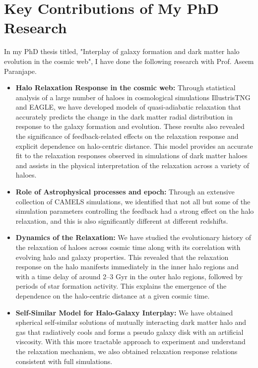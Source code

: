 \documentclass[10pt]{article}
\begin{document}
\section{Key Contributions of My PhD Research}

In my PhD thesis titled, "Interplay of galaxy formation and dark matter halo evolution in the cosmic web", I have done the following research with Prof. Aseem Paranjape.

\begin{itemize}
    \item \textbf{Halo Relaxation Response in the cosmic web:} Through statistical analysis of a large number of haloes in cosmological simulations IllustrisTNG and EAGLE, we have developed models of quasi-adiabatic relaxation that accurately predicts the change in the dark matter radial distribution in response to the galaxy formation and evolution. These results also revealed the significance of feedback-related effects on the relaxation response and explicit dependence on halo-centric distance. This model provides an accurate fit to the relaxation responses observed in simulations of dark matter haloes and assists in the physical interpretation of the relaxation across a variety of haloes.
    
    \item \textbf{Role of Astrophysical processes and epoch:} Through an extensive collection of CAMELS simulations, we identified that not all but some of the simulation parameters controlling the feedback had a strong effect on the halo relaxation, and this is also significantly different at different redshifts.
    
    \item \textbf{Dynamics of the Relaxation:}  We have studied the evolutionary history of the relaxation of haloes across cosmic time along with its correlation with evolving halo and galaxy properties. This revealed that the relaxation response on the halo manifests immediately in the inner halo regions and with a time delay of around 2–3 Gyr in the outer halo regions, followed by periods of star formation activity. This explains the emergence of the dependence on the halo-centric distance at a given cosmic time.
    
    \item \textbf{Self-Similar Model for Halo-Galaxy Interplay:} We have obtained spherical self-similar solutions of mutually interacting dark matter halo and gas that radiatively cools and forms a pseudo galaxy disk with an artificial viscosity. With this more tractable approach to experiment and understand the relaxation mechanism, we also obtained relaxation response relations consistent with full simulations.
\end{itemize}
\end{document}
